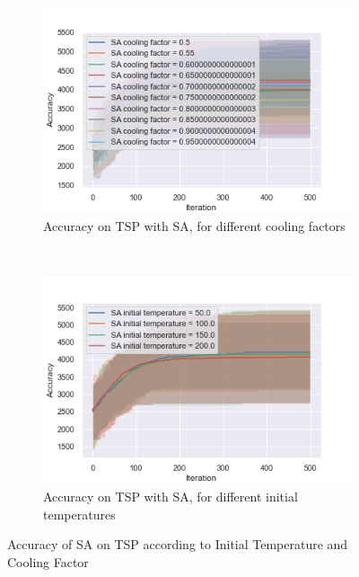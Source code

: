 \documentclass[10pt]{article}
\begin{document}
				\begin{figure}[h]
					\centering
					\begin{subfigure}[t]{0.45\columnwidth}
						\centering
						\includegraphics[width=\linewidth]{../graphics/tsp_SA_Iteration_Error_SA_cooling_factor.png}
						\caption{Accuracy on TSP with SA, for different cooling factors}
						\label{tsp:sa_cooling}
					\end{subfigure}
					~
					\begin{subfigure}[t]{0.45\columnwidth}
						\centering
						\includegraphics[width=1\linewidth]{../graphics/tsp_SA_Iteration_Error_SA_initial_temperature.png}
						\caption{Accuracy on TSP with SA, for different initial temperatures}
						\label{tsp:sa_initial_temp}
					\end{subfigure}
					\caption{Accuracy of SA on TSP according to Initial Temperature and Cooling Factor}
					\label{tsp:sa}
				\end{figure}
\end{document}
